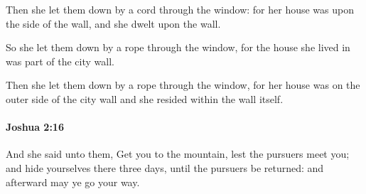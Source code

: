 			\begin{versebox}
					\item[BHS] 
					\item[ASV] Then she let them down by a cord through the window: for her house was upon the side of the wall, and she dwelt upon the wall.
					\item[NIV] So she let them down by a rope through the window, for the house she lived in was part of the city wall.
					\item[NRSV] Then she let them down by a rope through the window, for her house was on the outer side of the city wall and she resided within the wall itself.
			\end{versebox}

		\paragraph{Joshua 2:16} %
			\label{JOSHUA-2-16}

			And she said unto them, Get you to the mountain, lest the pursuers meet you; and hide yourselves there three days, until the pursuers be returned: and afterward may ye go your way.

